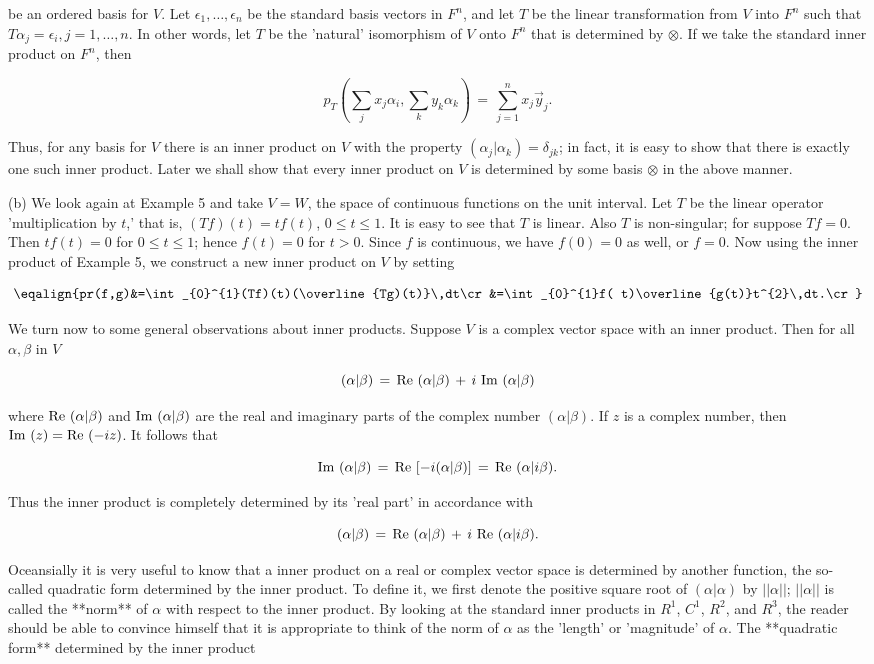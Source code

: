 be an ordered basis for \(V\). Let \(\epsilon_{1},\ldots,\epsilon_{n}\) be the standard basis vectors in \(F^{n}\), and let \(T\) be the linear transformation from \(V\) into \(F^{n}\) such that \(T\alpha_{j}=\epsilon_{i},j=1,\ldots,n\). In other words, let \(T\) be the 'natural' isomorphism of \(V\) onto \(F^{n}\) that is determined by \(\otimes\). If we take the standard inner product on \(F^{n}\), then

\[p_{T}(\sum_{j}x_{j}\alpha_{i},\sum_{k}y_{k}\alpha_{k})\,=\,\sum_{j=1}^{n}x_{j} \vec{y}_{j}.\]

Thus, for any basis for \(V\) there is an inner product on \(V\) with the property \((\alpha_{j}|\alpha_{k})=\delta_{jk}\); in fact, it is easy to show that there is exactly one such inner product. Later we shall show that every inner product on \(V\) is determined by some basis \(\otimes\) in the above manner.

(b) We look again at Example 5 and take \(V=W\), the space of continuous functions on the unit interval. Let \(T\) be the linear operator 'multiplication by \(t\),' that is, \((Tf)(t)=tf(t)\), \(0\leq t\leq 1\). It is easy to see that \(T\) is linear. Also \(T\) is non-singular; for suppose \(Tf=0\). Then \(tf(t)=0\) for \(0\leq t\leq 1\); hence \(f(t)=0\) for \(t>0\). Since \(f\) is continuous, we have \(f(0)=0\) as well, or \(f=0\). Now using the inner product of Example 5, we construct a new inner product on \(V\) by setting

\[\eqalign{pr(f,g)&=\int_{0}^{1}(Tf)(t)(\overline{Tg)(t)}\,dt\cr&=\int_{0}^{1}f( t)\overline{g(t)}t^{2}\,dt.\cr}\]

We turn now to some general observations about inner products. Suppose \(V\) is a complex vector space with an inner product. Then for all \(\alpha,\beta\) in \(V\)

\[(\alpha|\beta)\,=\,{\rm Re}\,\,(\alpha|\beta)\,+\,i\,\,{\rm Im}\,\,(\alpha| \beta)\]

where \({\rm Re}\,\,(\alpha|\beta)\) and \({\rm Im}\,\,(\alpha|\beta)\) are the real and imaginary parts of the complex number \((\alpha|\beta)\). If \(z\) is a complex number, then \({\rm Im}\,\,(z)={\rm Re}\,\,(-iz)\). It follows that

\[{\rm Im}\,\,(\alpha|\beta)\,=\,{\rm Re}\,\,[-i(\alpha|\beta)]\,=\,{\rm Re}\, \,(\alpha|i\beta).\]

Thus the inner product is completely determined by its 'real part' in accordance with

\[(\alpha|\beta)\,=\,{\rm Re}\,\,(\alpha|\beta)\,+\,i\,\,{\rm Re}\,\,(\alpha|i \beta).\]

Oceansially it is very useful to know that a inner product on a real or complex vector space is determined by another function, the so-called quadratic form determined by the inner product. To define it, we first denote the positive square root of \((\alpha|\alpha)\) by \(||\alpha||\); \(||\alpha||\) is called the **norm** of \(\alpha\) with respect to the inner product. By looking at the standard inner products in \(R^{1}\), \(C^{1}\), \(R^{2}\), and \(R^{3}\), the reader should be able to convince himself that it is appropriate to think of the norm of \(\alpha\) as the 'length' or 'magnitude' of \(\alpha\). The **quadratic form** determined by the inner product 